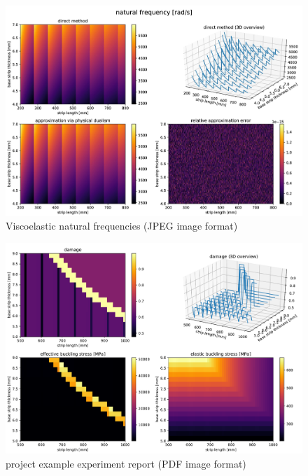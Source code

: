 \begin{figure}[H]
    \centering
    \includegraphics[width=\linewidth]{figures/barbero-viscoelastic@local-p1.jpg}
    \caption{Viscoelastic natural frequencies (JPEG image format) \cite{Milasinovic:2018}}
    \label{fig:barbero-viscoelastic-natural-frequencies}
\end{figure}

\begin{figure}[H]
    \centering
    \includegraphics[width=\linewidth]{figures/barbero-viscoelastic@fsm-damage-analysis.pdf}
    \caption{ project example experiment report (PDF image format) \cite{Project:fsm_damage_analysis:CodeRepository}}
    \label{fig:barbero-viscoelastic-damage-analysis}
\end{figure}

